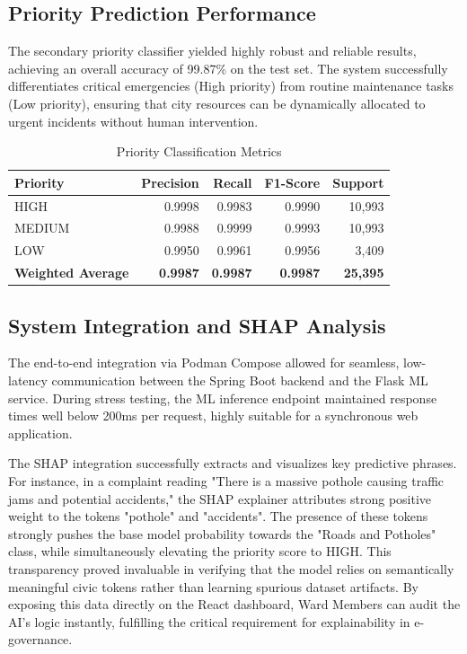 \documentclass[conference]{IEEEtran}
\begin{document}
\subsection{Priority Prediction Performance}
The secondary priority classifier yielded highly robust and reliable results, achieving an overall accuracy of 99.87\% on the test set. The system successfully differentiates critical emergencies (High priority) from routine maintenance tasks (Low priority), ensuring that city resources can be dynamically allocated to urgent incidents without human intervention.

\begin{table}[htbp]
\caption{Priority Classification Metrics}
\label{tab:priority_results}
\centering
\renewcommand{\arraystretch}{1.2} 
\begin{tabular}{lrrrr}
\toprule
\textbf{Priority} & \textbf{Precision} & \textbf{Recall} & \textbf{F1-Score} & \textbf{Support} \\
\midrule
HIGH & 0.9998 & 0.9983 & 0.9990 & 10,993 \\
MEDIUM & 0.9988 & 0.9999 & 0.9993 & 10,993 \\
LOW & 0.9950 & 0.9961 & 0.9956 & 3,409 \\
\midrule
\textbf{Weighted Average} & \textbf{0.9987} & \textbf{0.9987} & \textbf{0.9987} & \textbf{25,395} \\
\bottomrule
\end{tabular}
\end{table}

\subsection{System Integration and SHAP Analysis}
The end-to-end integration via Podman Compose allowed for seamless, low-latency communication between the Spring Boot backend and the Flask ML service. During stress testing, the ML inference endpoint maintained response times well below 200ms per request, highly suitable for a synchronous web application. 

The SHAP integration successfully extracts and visualizes key predictive phrases. For instance, in a complaint reading "There is a massive pothole causing traffic jams and potential accidents," the SHAP explainer attributes strong positive weight to the tokens "pothole" and "accidents". The presence of these tokens strongly pushes the base model probability towards the "Roads and Potholes" class, while simultaneously elevating the priority score to HIGH. This transparency proved invaluable in verifying that the model relies on semantically meaningful civic tokens rather than learning spurious dataset artifacts. By exposing this data directly on the React dashboard, Ward Members can audit the AI's logic instantly, fulfilling the critical requirement for explainability in e-governance.
\end{document}
